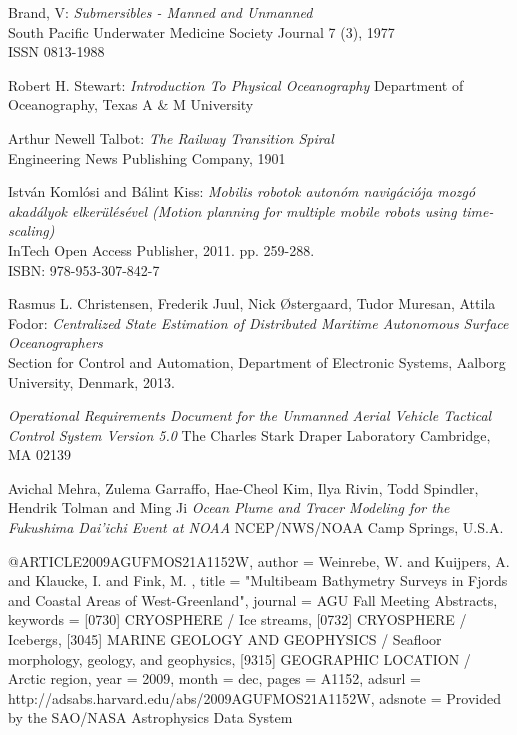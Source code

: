 \documentclass[12pt,a4paper,english,magyar,oneside]{report}
\begin{document}
\begin{thebibliography}{9}

  Brand, V:
  \emph{Submersibles - Manned and Unmanned}\\
  South Pacific Underwater Medicine Society Journal 7 (3), 1977\\
  ISSN 0813-1988
  
  Robert H. Stewart:
  \emph{Introduction To Physical Oceanography}
  Department of Oceanography, Texas A \& M University

  Arthur Newell Talbot:
  \emph{The Railway Transition Spiral}\\
  Engineering News Publishing Company, 1901

  Istv\'an Koml\'osi and B\'alint Kiss:
  \emph{Mobilis robotok auton\'om navig\'aci\'oja mozg\'o akad\'alyok elker\"ul\'es\'evel (Motion planning for multiple mobile robots using time-scaling)}\\
  InTech Open Access Publisher, 2011. pp. 259-288.\\
  ISBN: 978-953-307-842-7
  
	Rasmus L. Christensen, Frederik Juul, Nick \O stergaard, Tudor Muresan, Attila Fodor:
	\emph{Centralized State Estimation of Distributed Maritime Autonomous Surface Oceanographers}\\
	Section for Control and Automation, Department of Electronic Systems, Aalborg University, Denmark, 2013.
	
	
	\emph{Operational Requirements Document for the Unmanned Aerial Vehicle Tactical Control System Version 5.0}
	The Charles Stark Draper Laboratory Cambridge, MA 02139
	
	Avichal Mehra, Zulema Garraffo, Hae-Cheol Kim, Ilya Rivin, Todd Spindler, Hendrik Tolman and Ming Ji
	\emph{Ocean Plume and Tracer Modeling for the Fukushima Dai'ichi Event at NOAA}
	NCEP/NWS/NOAA Camp Springs, U.S.A.
	
@ARTICLE{2009AGUFMOS21A1152W,
   author = {{Weinrebe}, W. and {Kuijpers}, A. and {Klaucke}, I. and {Fink}, M.
	},
    title = "{Multibeam Bathymetry Surveys in Fjords and Coastal Areas of West-Greenland}",
  journal = {AGU Fall Meeting Abstracts},
 keywords = {[0730] CRYOSPHERE / Ice streams, [0732] CRYOSPHERE / Icebergs, [3045] MARINE GEOLOGY AND GEOPHYSICS / Seafloor morphology, geology, and geophysics, [9315] GEOGRAPHIC LOCATION / Arctic region},
     year = 2009,
    month = dec,
    pages = {A1152},
   adsurl = {http://adsabs.harvard.edu/abs/2009AGUFMOS21A1152W},
  adsnote = {Provided by the SAO/NASA Astrophysics Data System}
}

\end{thebibliography}
\end{document}
